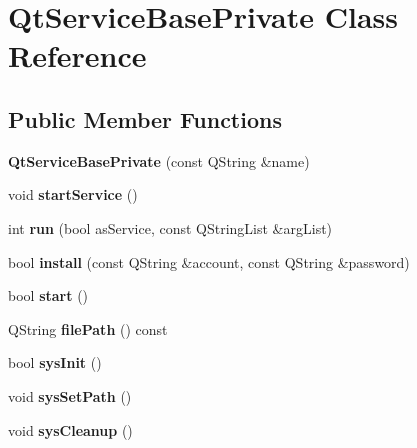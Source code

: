 \hypertarget{class_qt_service_base_private}{}\section{Qt\+Service\+Base\+Private Class Reference}
\label{class_qt_service_base_private}
\subsection*{Public Member Functions}
\begin{DoxyCompactItemize}
\item 
\mbox{\label{class_qt_service_base_private_a0a0e43286fe71580c6b6683b6afb3315}} 
{\bfseries Qt\+Service\+Base\+Private} (const Q\+String \&name)
\item 
\mbox{\label{class_qt_service_base_private_aba9704ace725a9c8603abac51b548173}} 
void {\bfseries start\+Service} ()
\item 
\mbox{\label{class_qt_service_base_private_a2ea81782bcb13927a60e0bf0d0772cc8}} 
int {\bfseries run} (bool as\+Service, const Q\+String\+List \&arg\+List)
\item 
\mbox{\label{class_qt_service_base_private_abd194ef7534f7c7c61e3a6126291cef2}} 
bool {\bfseries install} (const Q\+String \&account, const Q\+String \&password)
\item 
\mbox{\label{class_qt_service_base_private_a9f6c57d4daaaf630740d68357ab8b190}} 
bool {\bfseries start} ()
\item 
\mbox{\label{class_qt_service_base_private_abe479b544fa351138600eca1aa25605f}} 
Q\+String {\bfseries file\+Path} () const
\item 
\mbox{\label{class_qt_service_base_private_a33b5a1053664ec5fcffa1190e6321ed8}} 
bool {\bfseries sys\+Init} ()
\item 
\mbox{\label{class_qt_service_base_private_aa94178427a8a87d0d1e3a7051a51c1bb}} 
void {\bfseries sys\+Set\+Path} ()
\item 
\mbox{\label{class_qt_service_base_private_a0543878130d3a883380e14bc17c166ad}} 
void {\bfseries sys\+Cleanup} ()
\end{DoxyCompactItemize}
